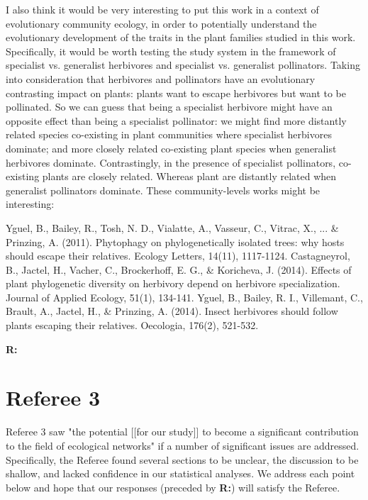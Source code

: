 \documentclass[12pt]{letter}
\newenvironment{refquote}{\bigskip \begin{it}}{\end{it}\smallskip}
\begin{document}
    \begin{refquote}

      I also think it would be very interesting to put this work in a context of evolutionary community ecology, in order to potentially understand the evolutionary development of the traits in the plant families studied in this work. Specifically, it would be worth testing the study system in the framework of specialist vs. generalist herbivores and specialist vs. generalist pollinators. Taking into consideration that herbivores and pollinators have an evolutionary contrasting impact on plants: plants want to escape herbivores but want to be pollinated. So we can guess that being a specialist herbivore might have an opposite effect than being a specialist pollinator: we might find more distantly related species co-existing in plant communities where specialist herbivores dominate; and more closely related co-existing plant species when generalist herbivores dominate. Contrastingly, in the presence of specialist pollinators, co-existing plants are closely related. Whereas plant are distantly related when generalist pollinators dominate. These community-levels works might be interesting:

      \smallskip
      
      Yguel, B., Bailey, R., Tosh, N. D., Vialatte, A., Vasseur, C., Vitrac, X., ... \& Prinzing, A. (2011). Phytophagy on phylogenetically isolated trees: why hosts should escape their relatives. Ecology Letters, 14(11), 1117-1124.
      \smallskip
      Castagneyrol, B., Jactel, H., Vacher, C., Brockerhoff, E. G., \& Koricheva, J. (2014). Effects of plant phylogenetic diversity on  herbivory depend on herbivore specialization. Journal of Applied Ecology, 51(1), 134-141.
      \smallskip
      Yguel, B., Bailey, R. I., Villemant, C., Brault, A., Jactel, H., \& Prinzing, A. (2014). Insect herbivores should follow plants escaping their relatives. Oecologia, 176(2), 521-532.

      \end{refquote}


    \textbf{R:}


\section*{Referee 3}

  Referee 3 saw "the potential [[for our study]] to become a significant contribution to the field of ecological networks" if a number of significant issues are addressed. Specifically, the Referee found several sections to be unclear, the discussion to be shallow, and lacked confidence in our statistical analyses. We address each point below and hope that our responses (preceded by \textbf{R:}) will satisfy the Referee.
\end{document}

